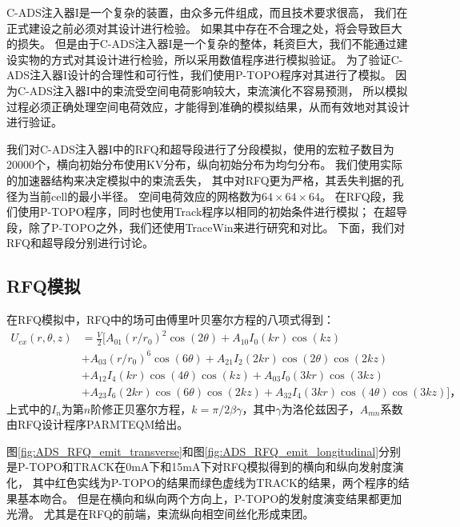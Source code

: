C-ADS注入器I是一个复杂的装置，由众多元件组成，而且技术要求很高，
我们在正式建设之前必须对其设计进行检验。
如果其中存在不合理之处，将会导致巨大的损失。
但是由于C-ADS注入器I是一个复杂的整体，耗资巨大，我们不能通过建设实物的方式对其设计进行检验，所以采用数值程序进行模拟验证。
为了验证C-ADS注入器I设计的合理性和可行性，我们使用P-TOPO程序对其进行了模拟。
因为C-ADS注入器I中的束流受空间电荷影响较大，束流演化不容易预测，
所以模拟过程必须正确处理空间电荷效应，才能得到准确的模拟结果，从而有效地对其设计进行验证。

我们对C-ADS注入器I中的RFQ和超导段进行了分段模拟，使用的宏粒子数目为20000个，横向初始分布使用KV分布，纵向初始分布为均匀分布。
我们使用实际的加速器结构来决定模拟中的束流丢失，
其中对RFQ更为严格，其丢失判据的孔径为当前cell的最小半径。
空间电荷效应的网格数为$64 \times 64 \times 64$。
在RFQ段，我们使用P-TOPO程序，同时也使用Track程序\cite{aseev2005track}以相同的初始条件进行模拟；
在超导段，除了P-TOPO之外，我们还使用TraceWin\cite{uriot2014tracewin}来进行研究和对比。
下面，我们对RFQ和超导段分别进行讨论。

\subsection{RFQ模拟}    \label{section:ADS_simulation_RFQ}
在RFQ模拟中，RFQ中的场可由傅里叶贝塞尔方程的八项式得到：
\begin{equation}
    \begin{aligned}
       {{U}_{ex}}(r,\theta ,z) & =\frac{V}{2}[{{A}_{01}}{{(r/{{r}_{0}})}^{2}}\cos (2\theta )+{{A}_{10}}{{I}_{0}}(kr)\cos (kz) \\
     & +{{A}_{03}}{{(r/{{r}_{0}})}^{6}}\cos (6\theta )+{{A}_{21}}{{I}_{2}}(2kr)\cos (2\theta )\cos (2kz) \\
     & +{{A}_{12}}{{I}_{4}}(kr)\cos (4\theta )\cos (kz)+{{A}_{03}}{{I}_{0}}(3kr)\cos (3kz) \\
     & +{{A}_{23}}{{I}_{6}}(2kr)\cos (6\theta )\cos (2kz)+{{A}_{32}}{{I}_{4}}(3kr)\cos (4\theta )\cos (3kz)] \text{，}
    \end{aligned}
    \label{eq:RFQ_8terms}
\end{equation}
上式中的$I_n$为第$n$阶修正贝塞尔方程，$k=\pi / 2  \beta \gamma $，其中$\gamma$为洛伦兹因子，$A_{mn}$系数由RFQ设计程序PARMTEQM给出。

图\eqref{fig:ADS_RFQ_emit_transverse}和图\eqref{fig:ADS_RFQ_emit_longitudinal}分别是P-TOPO和TRACK在0mA下和15mA下对RFQ模拟得到的横向和纵向发射度演化，
其中红色实线为P-TOPO的结果而绿色虚线为TRACK的结果，两个程序的结果基本吻合。
但是在横向和纵向两个方向上，P-TOPO的发射度演变结果都更加光滑。
尤其是在RFQ的前端，束流纵向相空间丝化形成束团。

